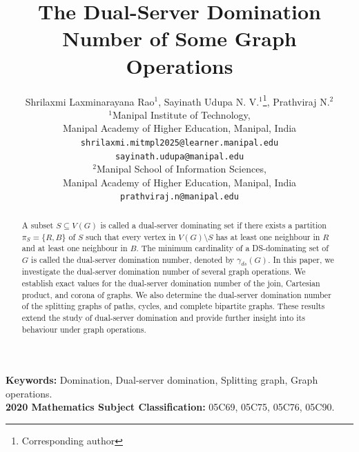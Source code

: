 \documentclass{article}
\title{The Dual-Server Domination Number of Some Graph Operations}
\author{
Shrilaxmi Laxminarayana Rao$^{1}$,
Sayinath Udupa N. V.$^{1}$\footnote{Corresponding author}, Prathviraj N.$^{2}$\\[1ex]
$^{1}$Manipal Institute of Technology,\\
Manipal Academy of Higher Education, Manipal, India\\
\texttt{shrilaxmi.mitmpl2025@learner.manipal.edu}\\
\texttt{sayinath.udupa@manipal.edu}\\[1ex]
$^{2}$Manipal School of Information Sciences,\\
Manipal Academy of Higher Education, Manipal, India\\
\texttt{prathviraj.n@manipal.edu}
}
\date{}
\begin{document}
\justifying
\maketitle
\begin{abstract}
A subset $S \subseteq V(G)$ is called a dual-server dominating set if there exists a partition $\pi_S=\{R,B\}$ of $S$ such that every vertex in $V(G)\setminus S$ has at least one neighbour in $R$ and at least one neighbour in $B.$ The minimum cardinality of a DS-dominating set of $G$ is called the dual-server domination number, denoted by $\gamma_{ds}(G)$. In this paper, we investigate the dual-server domination number of several graph operations. We establish exact values for the dual-server domination number of the join, Cartesian product, and corona of graphs. We also determine the dual-server domination number of the splitting graphs of paths, cycles, and complete bipartite graphs. These results extend the study of dual-server domination and provide further insight into its behaviour under graph operations.
\end{abstract}
\textbf{Keywords:} Domination, Dual-server domination, Splitting graph, Graph operations.\\
\noindent\textbf{2020 Mathematics Subject Classification:}
05C69, 05C75, 05C76, 05C90.
\end{document}
